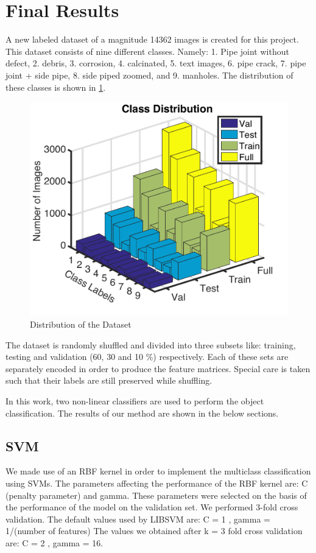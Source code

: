 \documentclass[letterpaper,12pt, onecolumn]{article}%
\begin{document}
\section{Final Results} \label{sec:final_results}
\noindent
A new labeled dataset of a magnitude 14362 images is created for this project. This dataset consists of nine different classes. Namely: 1. Pipe joint without defect, 2. debris, 3. corrosion, 4. calcinated, 5. text images,  6. pipe crack, 7. pipe joint + side pipe, 8. side piped zoomed, and 9. manholes. The distribution of these classes is shown in \cref{fig:class_distribution}.
\begin{figure}[!hbtp]
 	  \centering
 	   \includegraphics[scale=0.75] {fig_class_distribution.pdf} 
 	   \caption{Distribution of the Dataset }
       \label{fig:class_distribution}
\end{figure}

The dataset is randomly shuffled and divided into three subsets like: training, testing and validation (60, 30 and 10 \%) respectively. Each of these sets are separately encoded in order to produce the feature matrices. Special care is taken such that their labels are still preserved while shuffling.

In this work, two non-linear classifiers are used to perform the object classification. The results of our method are shown in the below sections.
\subsection{SVM}
We made use of an RBF kernel in order to implement the multiclass classification using SVMs. The parameters affecting the performance of the RBF kernel are: C (penalty parameter) and gamma. 
These parameters were selected on the basis of the performance of the model on the validation set.
We performed 3-fold cross validation. The default values used by LIBSVM are:
C = 1 , gamma = 1/(number of features)
The values we obtained after k = 3 fold cross validation are:
C = 2 , gamma = 16.
\end{document}
